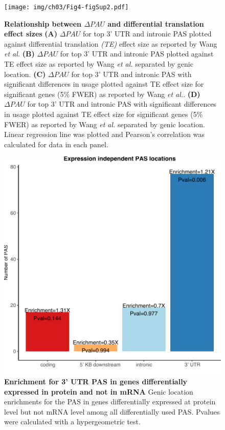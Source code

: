 \begin{figure}[!htb]
\centering
\texttt{[image: img/ch03/Fig4-figSup2.pdf]}
\caption[Relationship between $\Delta PAU$  and differential translation effect sizes]{\textbf{Relationship between $\Delta PAU$  and differential translation effect sizes} {\bf (A)} $\Delta PAU$ for top 3' UTR and intronic PAS plotted against differential translation \emph{(TE)} effect size as reported by Wang \emph{et al.}\citep{wang_post-translational_2018} {\bf (B)} $\Delta PAU$ for top 3' UTR and intronic PAS plotted against TE effect size as reported by Wang \emph{et al.} \citep{wang_post-translational_2018} separated by genic location.  {\bf (C)} $\Delta PAU$ for top 3' UTR and intronic PAS with significant differences in usage plotted against TE effect size for significant genes (5\% FWER) as reported by Wang \emph{et al.}\citep{wang_post-translational_2018}. {\bf (D)}  $\Delta PAU$ for top 3' UTR and intronic PAS with significant differences in usage plotted against TE effect size for significant genes (5\% FWER) as reported by Wang \emph{et al.}\citep{wang_post-translational_2018} separated by genic location. Linear regression line was plotted and Pearson's correlation was calculated for data in each panel.}
\label{fig:ch03-TEdAPA}
\end{figure}
\clearpage

\begin{figure}[!htb]
\centering
\includegraphics[width=5in]{img/ch03/Fig6-figSup1.pdf}
\caption[Enrichment for 3' UTR PAS in genes differentially expressed in protein and not in mRNA]{\textbf{Enrichment for 3' UTR PAS in genes differentially expressed in protein and not in mRNA} Genic location enrichments for the PAS in genes differentially expressed at protein level but not mRNA level among all differentially used PAS. Pvalues were calculated with a hypergeometric test.}
\label{fig:ch03-dpnotE}
\end{figure}
\clearpage


